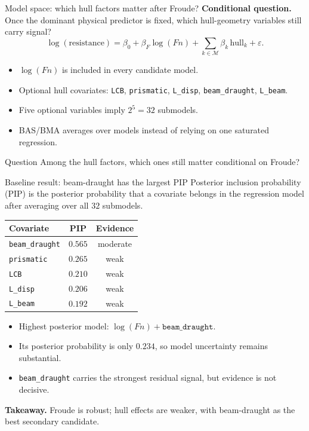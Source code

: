 \documentclass[11pt,aspectratio=169]{beamer}
\newcommand{\Fn}{\ensuremath{F\!n}}
\begin{document}
\begin{frame}{Model space: which hull factors matter after Froude?}
	\textbf{Conditional question.} Once the dominant physical predictor is fixed,
	which hull-geometry variables still carry signal?
	\[
		\log(\mathrm{resistance}) =
		\beta_0 + \beta_F \log(\Fn)
		+ \sum_{k \in \mathcal{M}} \beta_k\,\mathrm{hull}_k
		+ \varepsilon.
	\]
	\begin{itemize}
		\item $\log(\Fn)$ is included in every candidate model.
		\item Optional hull covariates: \texttt{LCB}, \texttt{prismatic},
		      \texttt{L\_disp}, \texttt{beam\_draught}, \texttt{L\_beam}.
		\item Five optional variables imply $2^5 = 32$ submodels.
		\item BAS/BMA averages over models instead of relying on one saturated regression.
	\end{itemize}
	\begin{block}{Question}
		Among the hull factors, which ones still matter conditional on Froude?
	\end{block}
\end{frame}

\begin{frame}{Baseline result: beam-draught has the largest PIP}
	\small
	Posterior inclusion probability (PIP) is the posterior probability that a
	covariate belongs in the regression model after averaging over all $32$ submodels.
	\vspace{0.4em}
	\begin{center}
		\begin{tabular}{lcc}
			\toprule
			\textbf{Covariate} & \textbf{PIP} & \textbf{Evidence} \\
			\midrule
			\texttt{beam\_draught} & $0.565$ & moderate \\
			\texttt{prismatic} & $0.265$ & weak \\
			\texttt{LCB} & $0.210$ & weak \\
			\texttt{L\_disp} & $0.206$ & weak \\
			\texttt{L\_beam} & $0.192$ & weak \\
			\bottomrule
		\end{tabular}
	\end{center}
	\begin{itemize}
		\item Highest posterior model: $\log(\Fn) + \texttt{beam\_draught}$.
		\item Its posterior probability is only $0.234$, so model uncertainty remains substantial.
		\item \texttt{beam\_draught} carries the strongest residual signal, but evidence is not decisive.
	\end{itemize}
	\textbf{Takeaway.} Froude is robust; hull effects are weaker, with beam-draught as the best secondary candidate.
\end{frame}
\end{document}
